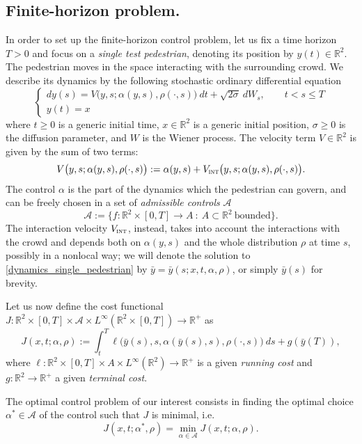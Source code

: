 \documentclass{cmslatex}
\newcommand{\R}{\mathbb{R}}
\newcommand{\alphastar}{\alpha^*}
\newcommand{\Vi}{V_\textsc{int}}
\renewcommand{\r}{\rho}
\begin{document}
\medskip

\subsection{Finite-horizon problem.}
In order to set up the finite-horizon control problem, let us  fix a time horizon $T>0$ and focus on a \textit{single test pedestrian}, denoting its position by $y(t)\in\R^2$.
The pedestrian moves in the space interacting with the surrounding crowd. We describe its dynamics by the following stochastic ordinary differential equation
\begin{equation}\label{dynamics_single_pedestrian}
\left\{\begin{array}{ll}
dy(s)=V\big(y,s;\alpha(y,s),\r(\cdot,s)\big)\ dt+\sqrt{2\sigma}\ dW_s, \qquad t<s\leq T \\ [2mm]
y(t)=x
\end{array}
\right.
\end{equation}
where $t\geq 0$ is a generic initial time, $x\in\R^2$ is a generic initial position, $\sigma\geq 0$ is the diffusion parameter, and $W$ is the Wiener process. The velocity term $V\in\R^2$ is given by the sum of two terms:
$$
V\big(y,s;\alpha(y,s),\r(\cdot,s)\big):=\alpha(y,s)+\Vi\big(y,s;\alpha(y,s),\r(\cdot,s)\big).
$$
The control $\alpha$ is the part of the dynamics which the pedestrian can govern, and can be freely chosen in a set of \textit{admissible controls} $\mathcal A$
$$
\mathcal A:=\{f:\R^2\times[0,T]\to A\ :\ A\subset \R^2\ \text{bounded}\}.
$$ 
The interaction velocity $\Vi$, instead,  takes into account the interactions with the crowd and depends both on $\alpha(y,s)$ and the whole distribution $\r$ at time $s$, possibly in a nonlocal way;
we will denote the solution to \eqref{dynamics_single_pedestrian} by $\bar y=\bar y(s;x,t,\alpha,\r)$, or simply $\bar y(s)$ for brevity.

Let us now define the cost functional $J:\R^2\times[0,T]\times\mathcal A\times L^\infty(\R^2\times[0,T])\to\R^+$ as
\begin{equation}\label{def:J}
J(x,t;\alpha,\r):=\int_t^T \ell \big(\bar y(s),s,\alpha(\bar y(s),s),\r(\cdot,s) \big) \ ds + g(\bar y(T)),
\end{equation}
where $\ell:\R^2\times[0,T]\times A\times L^\infty(\R^2)\to\R^+$ is a given \textit{running cost} and $g:\R^2\to\R^+$ a given \textit{terminal cost}.

The optimal control problem of our interest consists in finding the optimal choice $\alphastar\in\mathcal A$ of the control such that $J$ is minimal, i.e.
\begin{equation}\label{alphastar}
J(x,t;\alphastar,\r)=\min_{\alpha\in\mathcal A} J(x,t;\alpha,\r).
\end{equation}
\end{document}
